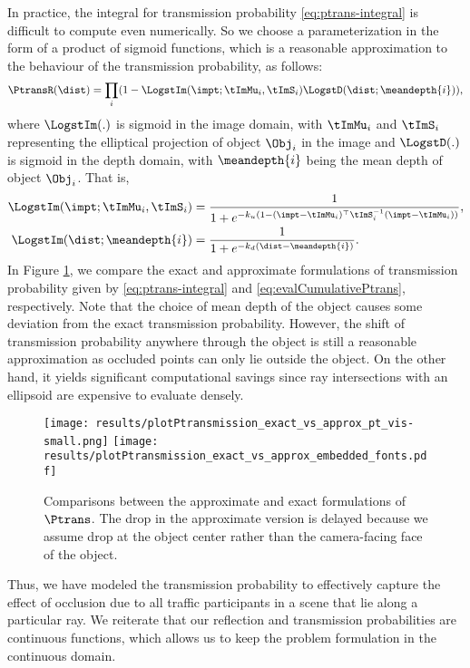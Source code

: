 In practice, the integral for transmission probability \eqref{eq:ptrans-integral} is difficult to compute even numerically. So we choose a parameterization in the form of a product of sigmoid functions, which is a reasonable approximation to the behaviour of the transmission probability, as follows:
%
\begin{align}
  \PtransR(\dist) = \prod_i (1 - \LogstIm (\impt; \tImMu_i, \tImS_i) \LogstD(\dist; \meandepth{i})),
\label{eq:evalCumulativePtrans}
\end{align}
%
where $\LogstIm(.)$ is sigmoid in the image domain, with $\tImMu_i$ and $\tImS_i$ representing the elliptical projection of object $\Obj_i$ in the image and $\LogstD(.)$ is sigmoid in the depth domain, with $\meandepth{i}$ being the mean depth of object $\Obj_i$. That is,
%
\begin{align}
\LogstIm(\impt; \tImMu_i, \tImS_i) &= \frac{1}{1 + e^{-k_u(1 - (\impt - \tImMu_i)^\top \tImS_i^{-1} (\impt - \tImMu_i))}}, \\
  \LogstIm(\dist; \meandepth{i}) &= \frac{1}{1 + e^{-k_d(\dist - \meandepth{i})}}.
\end{align}
%
In Figure \ref{fig:compare:exact:approx:ptrans}, we compare the exact and approximate formulations of transmission probability given by \eqref{eq:ptrans-integral} and \eqref{eq:evalCumulativePtrans}, respectively. Note that the choice of mean depth of the object causes some deviation from the exact transmission probability. However, the shift of transmission probability anywhere through the object is still a reasonable approximation as occluded points can only lie outside the object. On the other hand, it yields significant computational savings since ray intersections with an ellipsoid are expensive to evaluate densely.


\begin{figure}
\centering
  \texttt{[image: results/plotPtransmission\_exact\_vs\_approx\_pt\_vis-small.png]}%
  \texttt{[image: results/plotPtransmission\_exact\_vs\_approx\_embedded\_fonts.pdf]}
  \vspace{-0.3cm}
  \caption{Comparisons between the approximate and exact formulations of $\Ptrans$. The drop in the approximate version is delayed because we assume drop at the object center rather than the camera-facing face of the object.}
  \label{fig:compare:exact:approx:ptrans}
  \vspace{-0.3cm}
\end{figure}

Thus, we have modeled the transmission probability to effectively capture the effect of occlusion due to all traffic participants in a scene that lie along a particular ray. We reiterate that our reflection and transmission probabilities are continuous functions, which allows us to keep the problem formulation in the continuous domain.
